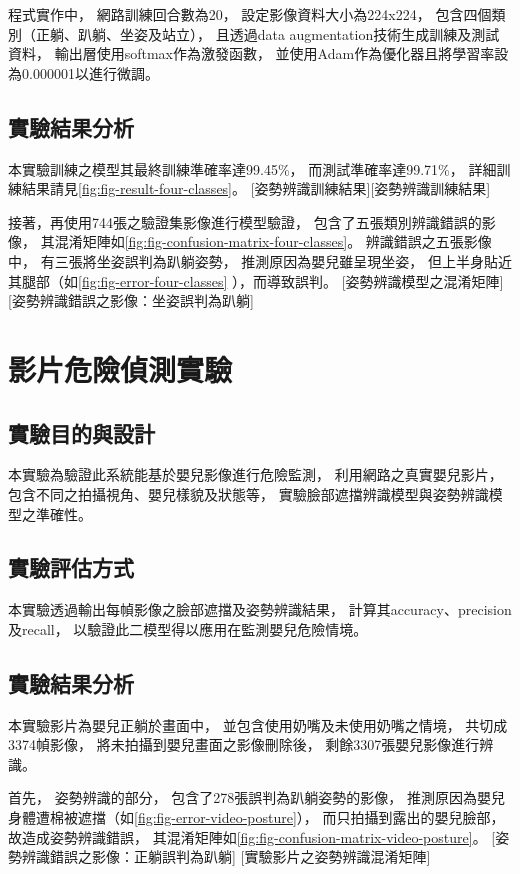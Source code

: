 \documentclass[class=NCU_thesis, crop=false]{standalone}
\begin{document}
程式實作中，
網路訓練回合數為20，
設定影像資料大小為224x224，
包含四個類別（正躺、趴躺、坐姿及站立），
且透過data augmentation技術生成訓練及測試資料，
輸出層使用softmax作為激發函數，
並使用Adam作為優化器且將學習率設為0.000001以進行微調。

\subsection{實驗結果分析}
本實驗訓練之模型其最終訓練準確率達99.45\%，
而測試準確率達99.71\%，
詳細訓練結果請見\cref{fig:fig-result-four-classes}。
[姿勢辨識訓練結果][姿勢辨識訓練結果]

接著，再使用744張之驗證集影像進行模型驗證，
包含了五張類別辨識錯誤的影像，
其混淆矩陣如\cref{fig:fig-confusion-matrix-four-classes}。
辨識錯誤之五張影像中，
有三張將坐姿誤判為趴躺姿勢，
推測原因為嬰兒雖呈現坐姿，
但上半身貼近其腿部（如\cref{fig:fig-error-four-classes}
），而導致誤判。
[姿勢辨識模型之混淆矩陣]
[姿勢辨識錯誤之影像：坐姿誤判為趴躺]

\section{影片危險偵測實驗}
\subsection{實驗目的與設計}
本實驗為驗證此系統能基於嬰兒影像進行危險監測，
利用網路之真實嬰兒影片，
包含不同之拍攝視角、嬰兒樣貌及狀態等，
實驗臉部遮擋辨識模型與姿勢辨識模型之準確性。

\subsection{實驗評估方式}
本實驗透過輸出每幀影像之臉部遮擋及姿勢辨識結果，
計算其accuracy、precision及recall，
以驗證此二模型得以應用在監測嬰兒危險情境。

\subsection{實驗結果分析}
本實驗影片為嬰兒正躺於畫面中，
並包含使用奶嘴及未使用奶嘴之情境，
共切成3374幀影像，
將未拍攝到嬰兒畫面之影像刪除後，
剩餘3307張嬰兒影像進行辨識。

首先，
姿勢辨識的部分，
包含了278張誤判為趴躺姿勢的影像，
推測原因為嬰兒身體遭棉被遮擋（如\cref{fig:fig-error-video-posture}），
而只拍攝到露出的嬰兒臉部，
故造成姿勢辨識錯誤，
其混淆矩陣如\cref{fig:fig-confusion-matrix-video-posture}。
[姿勢辨識錯誤之影像：正躺誤判為趴躺]
[實驗影片之姿勢辨識混淆矩陣]
\end{document}
